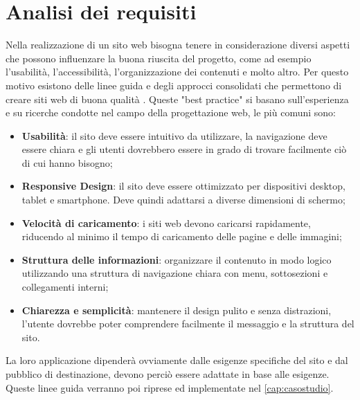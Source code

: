 \documentclass[target=bach,aauheader=]{thud}
\begin{document}
\section{Analisi dei requisiti}
Nella realizzazione di un sito web bisogna tenere in considerazione diversi aspetti che possono influenzare la buona riuscita del progetto, come ad esempio l'usabilità, l'accessibilità, l'organizzazione dei contenuti e molto altro.
Per questo motivo esistono delle linee guida e degli approcci consolidati che permettono di creare siti web di buona qualità \cite{hong2006influence}. Queste "best practice" si basano sull'esperienza e su ricerche condotte nel campo della progettazione web, le più comuni sono:
\begin{itemize}
    \item \textbf{Usabilità}: il sito deve essere intuitivo da utilizzare, la navigazione deve essere chiara e gli utenti dovrebbero essere in grado di trovare facilmente ciò di cui hanno bisogno;
    \item \textbf{Responsive Design}: il sito deve essere ottimizzato per dispositivi desktop, tablet e smartphone. Deve quindi adattarsi a diverse dimensioni di schermo;
    \item \textbf{Velocità di caricamento}: i siti web devono caricarsi rapidamente, riducendo al minimo il tempo di caricamento delle pagine e delle immagini;
    \item \textbf{Struttura delle informazioni}: organizzare il contenuto in modo logico utilizzando una struttura di navigazione chiara con menu, sottosezioni e collegamenti interni;
    \item \textbf{Chiarezza e semplicità}: mantenere il design pulito e senza distrazioni, l'utente dovrebbe poter comprendere facilmente il messaggio e la struttura del sito.
\end{itemize}
La loro applicazione dipenderà ovviamente dalle esigenze specifiche del sito e dal pubblico di destinazione, devono perciò essere adattate in base alle esigenze.
\newline Queste linee guida verranno poi riprese ed implementate nel \cref{cap:casostudio}.

\end{document}
